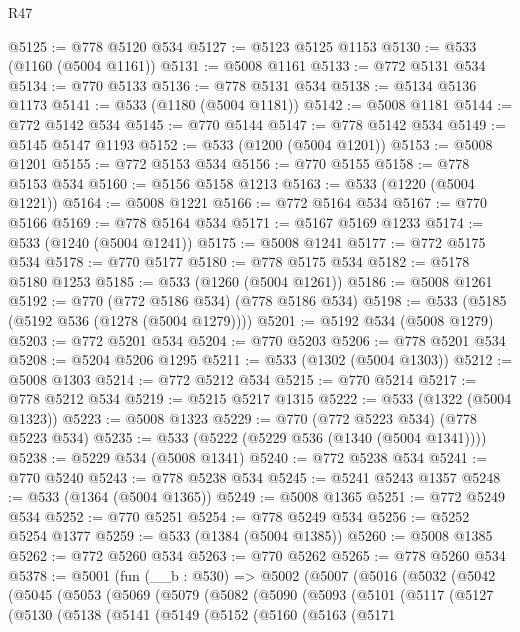\begin{lexlean}{R47}
\begin{coremodule}
@5125 := @778 @5120 @534
@5127 := @5123 @5125 @1153
@5130 := @533 (@1160 (@5004 @1161))
@5131 := @5008 @1161
@5133 := @772 @5131 @534
@5134 := @770 @5133
@5136 := @778 @5131 @534
@5138 := @5134 @5136 @1173
@5141 := @533 (@1180 (@5004 @1181))
@5142 := @5008 @1181
@5144 := @772 @5142 @534
@5145 := @770 @5144
@5147 := @778 @5142 @534
@5149 := @5145 @5147 @1193
@5152 := @533 (@1200 (@5004 @1201))
@5153 := @5008 @1201
@5155 := @772 @5153 @534
@5156 := @770 @5155
@5158 := @778 @5153 @534
@5160 := @5156 @5158 @1213
@5163 := @533 (@1220 (@5004 @1221))
@5164 := @5008 @1221
@5166 := @772 @5164 @534
@5167 := @770 @5166
@5169 := @778 @5164 @534
@5171 := @5167 @5169 @1233
@5174 := @533 (@1240 (@5004 @1241))
@5175 := @5008 @1241
@5177 := @772 @5175 @534
@5178 := @770 @5177
@5180 := @778 @5175 @534
@5182 := @5178 @5180 @1253
@5185 := @533 (@1260 (@5004 @1261))
@5186 := @5008 @1261
@5192 := @770 (@772 @5186 @534) (@778 @5186 @534)
@5198 := @533 (@5185 (@5192 @536 (@1278 (@5004 @1279))))
@5201 := @5192 @534 (@5008 @1279)
@5203 := @772 @5201 @534
@5204 := @770 @5203
@5206 := @778 @5201 @534
@5208 := @5204 @5206 @1295
@5211 := @533 (@1302 (@5004 @1303))
@5212 := @5008 @1303
@5214 := @772 @5212 @534
@5215 := @770 @5214
@5217 := @778 @5212 @534
@5219 := @5215 @5217 @1315
@5222 := @533 (@1322 (@5004 @1323))
@5223 := @5008 @1323
@5229 := @770 (@772 @5223 @534) (@778 @5223 @534)
@5235 := @533 (@5222 (@5229 @536 (@1340 (@5004 @1341))))
@5238 := @5229 @534 (@5008 @1341)
@5240 := @772 @5238 @534
@5241 := @770 @5240
@5243 := @778 @5238 @534
@5245 := @5241 @5243 @1357
@5248 := @533 (@1364 (@5004 @1365))
@5249 := @5008 @1365
@5251 := @772 @5249 @534
@5252 := @770 @5251
@5254 := @778 @5249 @534
@5256 := @5252 @5254 @1377
@5259 := @533 (@1384 (@5004 @1385))
@5260 := @5008 @1385
@5262 := @772 @5260 @534
@5263 := @770 @5262
@5265 := @778 @5260 @534
@5378 := @5001
    (fun (__b : @530) =>
    @5002
      (@5007
        (@5016
          (@5032
            (@5042
              (@5045
                (@5053
                  (@5069
                    (@5079
                      (@5082
                        (@5090
                          (@5093
                            (@5101
                              (@5117
                                (@5127
                                  (@5130
                                    (@5138
                                      (@5141
                                        (@5149
                                          (@5152
                                            (@5160
                                              (@5163
                                                (@5171

\end{coremodule}
\end{lexlean}
